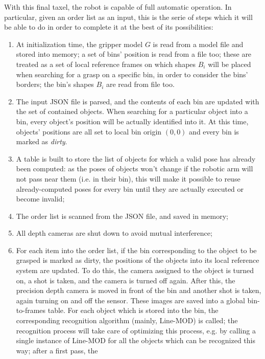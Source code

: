 With this final taxel, the robot is capable of full automatic
operation. In particular, given an order list as an input, this is the
serie of steps which it will be able to do in order to complete it at
the best of its possibilities:

\begin{enumerate}
\item{At initialization time, the gripper model $G$ is read from a
  model file and stored into memory; a set of bins' position is read
  from a file too; these are treated as a set of local reference
  frames on which shapes $B_i$ will be placed when searching for a
  grasp on a specific bin, in order to consider the bins' borders; the
  bin's shapes $B_i$ are read from file too.}
\item{The input JSON file is parsed, and the contents of each bin are
  updated with the set of contained objects. When searching for a
  particular object into a bin, every object's position will be actually
  identified into it. At this time, objects' positions are all set to
  local bin origin $(0,0)$ and every bin is marked as \emph{dirty}.}
\item{A table is built to store the list of objects for which a
  valid pose has already been computed: as the poses of objects won't
  change if the robotic arm will not pass near them (i.e. in their
  bin), this will make it possible to reuse already-computed poses for
  every bin until they are actually executed or become invalid;}
\item{The order list is scanned from the JSON file, and saved in
  memory;}
\item{All depth cameras are shut down to avoid mutual interference;}
\item{For each item into the order list, if the bin corresponding to
  the object to be grasped is marked as dirty, the positions of the
  objects into its local reference system are updated. To do this, the
  camera assigned to the object is turned on, a shot is taken, and the
  camera is turned off again. After this, the precision depth camera
  is moved in front of the bin and another shot is taken, again turning on
  and off the sensor. These images are saved into a global
  bin-to-frames table. For each object which is stored into the bin,
  the corresponding recognition algorithm (mainly, Line-MOD) is
  called; the recognition process will take care of optimizing this
  process, e.g. by calling a single instance of Line-MOD for all the
  objects which can be recognized this way; after a first pass, the
}
\end{enumerate}
